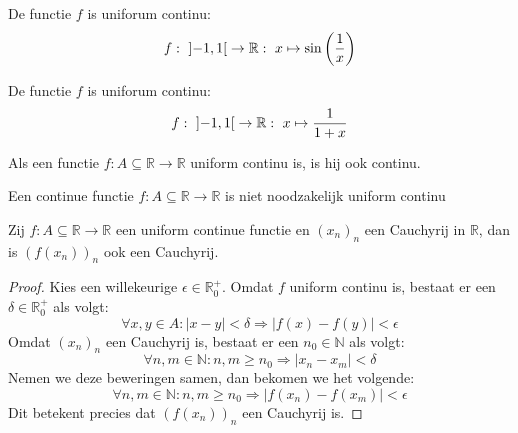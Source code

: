\documentclass[main.tex]{subfiles}
\begin{document}
\begin{vb}
  De functie $f$ is uniforum continu:
  \[ f:\ \interval[open]{-1}{1} \rightarrow \mathbb{R}:\ x \mapsto \sin\left(\frac{1}{x}\right) \]
    \begin{figure}[H]
      \centering
    \end{figure}
\end{vb}

\begin{vb}
  De functie $f$ is uniforum continu:
  \[ f:\ \interval[open]{-1}{1} \rightarrow \mathbb{R}:\ x \mapsto \frac{1}{1+x} \]
    \begin{figure}[H]
      \centering
    \end{figure}
\end{vb}

\begin{st}
  \label{st:uniform-continu-dan-ook-gewoon-continu}
  Als een functie $f: A \subseteq \mathbb{R} \rightarrow \mathbb{R}$ uniform continu is, is hij ook continu.
\end{st}

\begin{tvb}
  Een continue functie $f: A \subseteq \mathbb{R} \rightarrow \mathbb{R}$ is niet noodzakelijk uniform continu
\end{tvb}

\begin{bpr}
  \label{pr:uniform-continue-functie-behoudt-cauchy}
  Zij $f: A \subseteq \mathbb{R} \rightarrow \mathbb{R}$ een uniform continue functie en $(x_{n})_{n}$ een Cauchyrij in $\mathbb{R}$, dan is $(f(x_{n}))_{n}$ ook een Cauchyrij.

  \begin{proof}
    Kies een willekeurige $\epsilon \in \mathbb{R}_{0}^{+}$.
    Omdat $f$ uniform continu is, bestaat er een $\delta \in \mathbb{R}_{0}^{+}$ als volgt:
    \[ \forall x,y \in A: |x-y| < \delta \Rightarrow |f(x)-f(y)| < \epsilon \]
    Omdat $(x_{n})_{n}$ een Cauchyrij is, bestaat er een $n_{0}\in \mathbb{N}$ als volgt:
    \[ \forall n,m \in \mathbb{N}: n,m \ge n_{0} \Rightarrow |x_{n}-x_{m}| < \delta \]
    Nemen we deze beweringen samen, dan bekomen we het volgende:
    \[ \forall n,m \in \mathbb{N}: n,m \ge n_{0} \Rightarrow |f(x_{n})-f(x_{m})| < \epsilon \]
    Dit betekent precies dat $(f(x_{n}))_{n}$ een Cauchyrij is.
  \end{proof}
\end{bpr}
\end{document}
